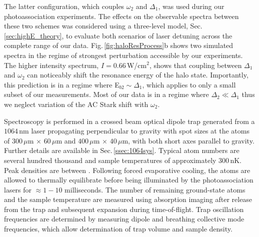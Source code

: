 The latter configuration, which couples $\omega_2$ and $\Delta_1$, was used during our photoassociation experiments.
The effects on the observable spectra between these two schemes was considered using a three-level model, Sec.\,\ref{sec:highE_theory}, to evaluate both scenarios of laser detuning across the complete range of our data.
Fig.\,\ref{fig:haloResProcess}b shows two simulated spectra in the regime of strongest perturbation accessible by our experiments.
The higher intensity spectrum, $I=0.66$\,W/cm$^2$, shows that coupling between $\Delta_1$ and $\omega_2$ can noticeably shift the resonance energy of the halo state. 
Importantly, this prediction is in a regime where E$_{b2} \sim \Delta_1$, which applies to only a small subset of our measurements.
Most of our data is in a regime where $\Delta_2 \ll \Delta_1$ thus we neglect variation of the AC Stark shift with $\omega_2$.


Spectroscopy is performed in a crossed beam optical dipole trap generated from a $1064$\,nm laser propagating perpendicular to gravity with spot sizes at the atoms of $300\,\mu\text{m}\,\times\,60\,\mu\text{m}$ and $400\,\mu\text{m}\,\times\,40\,\mu\text{m}$, with both short axes parallel to gravity.
Further details are available in Sec.\,\ref{ssec:1064sys}.
Typical atom numbers are several hundred thousand and sample temperatures of approximately $300\,\text{nK}$.
Peak densities are between .
Following forced evaporative cooling, the atoms are allowed to thermally equilibrate before being illuminated by the photoassociation lasers for $\approx\!1 - 10$ milliseconds.
The number of remaining ground-state atoms and the sample temperature are measured using absorption imaging after release from the trap and subsequent expansion during time-of-flight.
Trap oscillation frequencies are determined by measuring dipole and breathing collective mode frequencies, which allow determination of trap volume and sample density.

